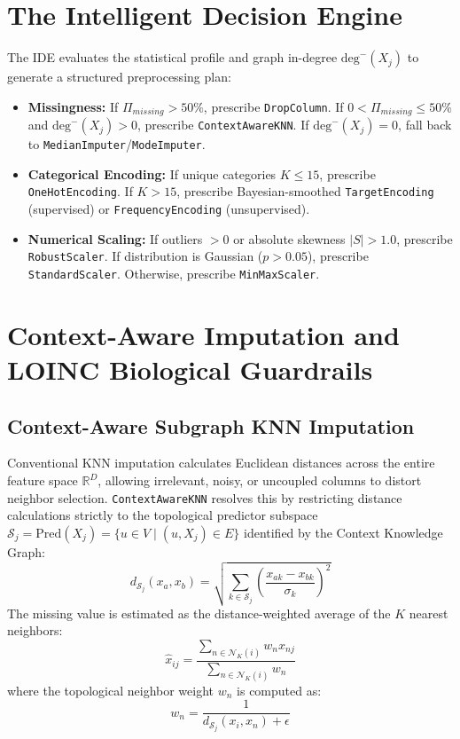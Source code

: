 \documentclass[MTech]{ugthesis}
\begin{document}
\section{The Intelligent Decision Engine}
The \ac{IDE} evaluates the statistical profile and graph in-degree $\text{deg}^-(X_j)$ to generate a structured preprocessing plan:
\begin{itemize}
    \item \textbf{Missingness:} If $\Pi_{missing} > 50\%$, prescribe \texttt{DropColumn}. If $0 < \Pi_{missing} \le 50\%$ and $\text{deg}^-(X_j) > 0$, prescribe \texttt{ContextAwareKNN}. If $\text{deg}^-(X_j) = 0$, fall back to \texttt{MedianImputer}/\texttt{ModeImputer}.
    \item \textbf{Categorical Encoding:} If unique categories $K \le 15$, prescribe \texttt{OneHotEncoding}. If $K > 15$, prescribe Bayesian-smoothed \texttt{TargetEncoding} (supervised) or \texttt{FrequencyEncoding} (unsupervised).
    \item \textbf{Numerical Scaling:} If outliers $> 0$ or absolute skewness $|S| > 1.0$, prescribe \texttt{RobustScaler}. If distribution is Gaussian ($p > 0.05$), prescribe \texttt{StandardScaler}. Otherwise, prescribe \texttt{MinMaxScaler}.
\end{itemize}

\section{Context-Aware Imputation and LOINC Biological Guardrails}

\subsection{Context-Aware Subgraph KNN Imputation}
Conventional \ac{KNN} imputation calculates Euclidean distances across the entire feature space $\mathbb{R}^D$, allowing irrelevant, noisy, or uncoupled columns to distort neighbor selection. \texttt{ContextAwareKNN} resolves this by restricting distance calculations strictly to the topological predictor subspace $\mathcal{S}_j = \text{Pred}(X_j) = \{u \in V \mid (u, X_j) \in E\}$ identified by the Context Knowledge Graph:
\begin{equation}
    d_{\mathcal{S}_j}(x_a, x_b) = \sqrt{\sum_{k \in \mathcal{S}_j} \left( \frac{x_{ak} - x_{bk}}{\sigma_k} \right)^2}
\end{equation}
The missing value is estimated as the distance-weighted average of the $K$ nearest neighbors:
\begin{equation}
    \hat{x}_{ij} = \frac{\sum_{n \in \mathcal{N}_K(i)} w_n x_{nj}}{\sum_{n \in \mathcal{N}_K(i)} w_n}
\end{equation}
where the topological neighbor weight $w_n$ is computed as:
\begin{equation}
    w_n = \frac{1}{d_{\mathcal{S}_j}(x_i, x_n) + \epsilon}
\end{equation}
\end{document}
